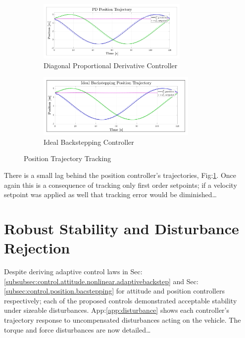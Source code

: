 \begin{figure}[hbtp]
\vspace{-11pt}
\begin{subfigure}{\textwidth}
\centering
\includegraphics[width=0.8\textwidth]{graphs/PD_Position_Trajectory}
\vspace{-12pt}
\caption{Diagonal Proportional Derivative Controller}
\end{subfigure}
\begin{subfigure}{\textwidth}
\vspace{-2pt}
\centering
\includegraphics[width=0.85\textwidth]{graphs/IBC_Position_Trajectory}
\vspace{-12pt}
\caption{Ideal Backstepping Controller}
\end{subfigure}
\vspace{-6pt}
\caption{Position Trajectory Tracking}
\label{fig:position-trajectory-tracking}
\vspace{-10pt}
\end{figure}
\par
There is a small lag behind the position controller's trajectories, Fig:\ref{fig:position-trajectory-tracking}. Once again this is a consequence of tracking only first order setpoints; if a velocity setpoint was applied as well that tracking error would be diminished\ldots
\section{Robust Stability and Disturbance Rejection}
\label{sec:simulation.disturbance}
Despite deriving adaptive control laws in Sec:\ref{subsubsec:control.attitude.nonlinear.adaptivebackstep} and Sec:\ref{subsec:control.position.bacstepping} for attitude and position controllers respectively; each of the proposed controls demonstrated acceptable stability under sizeable disturbances. App:\ref{app:disturbance} shows each controller's trajectory response to uncompensated disturbances acting on the vehicle. The torque and force disturbances are now detailed\ldots

